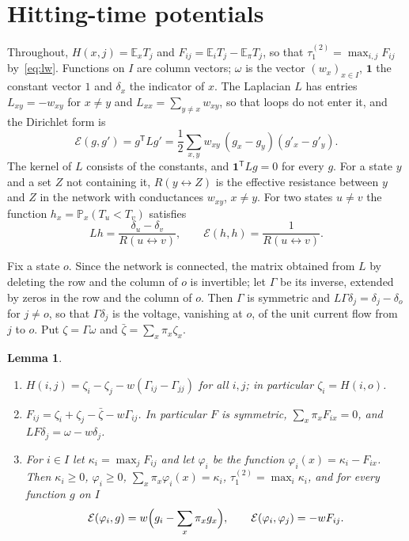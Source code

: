\documentclass[11pt]{amsart}
\newtheorem{lemma}[theorem]{Lemma}
\theoremstyle{definition}
\newcommand{\Prob}{\mathbb{P}}
\newcommand{\E}{\mathbb{E}}
\newcommand{\tmix}{\tau_1^{(2)}}
\newcommand{\lra}{\leftrightarrow}
\newcommand{\one}{\mathbf{1}}
\begin{document}
\section{Hitting-time potentials}\label{sec:pot}
Throughout, $H(x,j)=\E_xT_j$ and $F_{ij}=\E_iT_j-\E_\pi T_j$, so that $\tmix=\max_{i,j}F_{ij}$ by~\eqref{eq:lw}.
Functions on $I$ are column vectors; $\omega$ is the vector $(w_x)_{x\in I}$, $\one$ the constant vector $1$ and
$\delta_x$ the indicator of $x$. The Laplacian $L$ has entries $L_{xy}=-w_{xy}$ for $x\ne y$ and
$L_{xx}=\sum_{y\ne x}w_{xy}$, so that loops do not enter it, and the Dirichlet form is
\[
\mathcal E(g,g')=g^{\mathsf T}Lg'=\frac12\sum_{x,y}w_{xy}\,(g_x-g_y)(g'_x-g'_y).
\]
The kernel of $L$ consists of the constants, and $\one^{\mathsf T}Lg=0$ for every $g$. For a state $y$ and a set $Z$
not containing it, $R(y\lra Z)$ is the effective resistance between $y$ and $Z$ in the network with conductances
$w_{xy}$, $x\ne y$. For two states $u\ne v$ the function $h_x=\Prob_x(T_u<T_v)$ satisfies~\cite[Sections~2.2 and~2.4]{LP}
\begin{equation}\label{eq:harm}
Lh=\frac{\delta_u-\delta_v}{R(u\lra v)},\qquad \mathcal E(h,h)=\frac1{R(u\lra v)} .
\end{equation}

Fix a state $o$. Since the network is connected, the matrix obtained from $L$ by deleting the row and the column of
$o$ is invertible; let $\Gamma$ be its inverse, extended by zeros in the row and the column of $o$. Then $\Gamma$ is
symmetric and $L\Gamma\delta_j=\delta_j-\delta_o$ for $j\ne o$, so that $\Gamma\delta_j$ is the voltage, vanishing at
$o$, of the unit current flow from $j$ to $o$. Put $\zeta=\Gamma\omega$ and $\bar\zeta=\sum_x\pi_x\zeta_x$.

\begin{lemma}\label{lem:pot}
\begin{enumerate}
\item[(i)] $H(i,j)=\zeta_i-\zeta_j-w(\Gamma_{ij}-\Gamma_{jj})$ for all $i,j$; in particular $\zeta_i=H(i,o)$.
\item[(ii)] $F_{ij}=\zeta_i+\zeta_j-\bar\zeta-w\Gamma_{ij}$. In particular $F$ is symmetric,
$\sum_x\pi_xF_{ix}=0$, and $LF\delta_j=\omega-w\delta_j$.
\item[(iii)] For $i\in I$ let $\kappa_i=\max_jF_{ij}$ and let $\varphi_i$ be the function
$\varphi_i(x)=\kappa_i-F_{ix}$. Then $\kappa_i\ge0$, $\varphi_i\ge0$, $\sum_x\pi_x\varphi_i(x)=\kappa_i$,
$\tmix=\max_i\kappa_i$, and for every function $g$ on $I$
\begin{equation}\label{eq:energy}
\mathcal E(\varphi_i,g)=w\Bigl(g_i-\sum_x\pi_xg_x\Bigr),\qquad \mathcal E(\varphi_i,\varphi_j)=-wF_{ij}.
\end{equation}
\end{enumerate}
\end{lemma}
\end{document}
